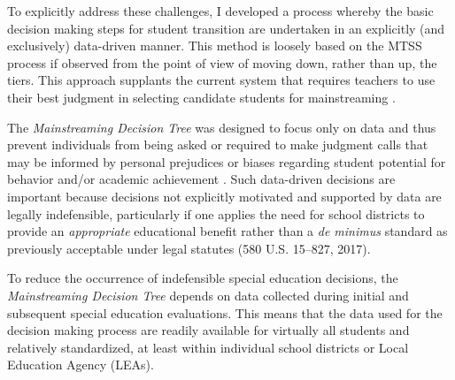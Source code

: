 \documentclass[twoside]{article}
\begin{document}
To explicitly address these challenges, I developed a process whereby the basic decision making steps for student transition are undertaken in an explicitly (and exclusively) data-driven manner. This method is loosely based on the MTSS process if observed from the point of view of moving down, rather than up, the tiers. This approach supplants the current system that requires teachers to use their best judgment in selecting candidate students for mainstreaming \parencite{fuchs1993conservative,fuchs1994classroom,marden2013criteria,mathes1998preparing,wadsworth1999preparing,wadsworth1999preparing,fuchs1994best}. 

The \textit{Mainstreaming Decision Tree} was designed to focus only on data and thus prevent individuals from being asked or required to make judgment calls that may be informed by personal prejudices or biases regarding student potential for behavior and/or academic achievement \parencite{raines2012universal,reynolds2009response}. Such data-driven decisions are important because decisions not explicitly motivated and supported by data are legally indefensible, particularly if one applies the need for school districts to provide an \textit{appropriate} educational benefit rather than a \textit{de minimus} standard as previously acceptable under legal statutes (580 U.S. 15–827, 2017).

To reduce the occurrence of indefensible special education decisions, the \textit{Mainstreaming Decision Tree} depends on data collected during initial and subsequent special education evaluations. This means that the data used for the decision making process are readily available for virtually all students and relatively standardized, at least within individual school districts or Local Education Agency (LEAs). 
\end{document}
